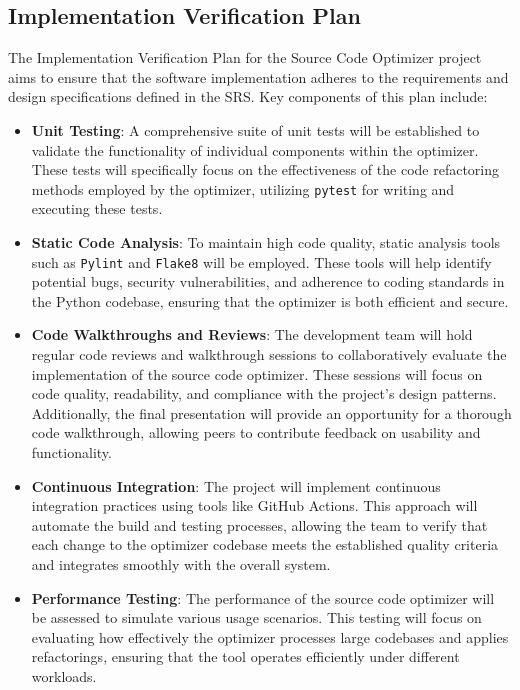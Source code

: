 \documentclass[12pt, titlepage]{article}
\begin{document}
\subsection{Implementation Verification Plan}

The Implementation Verification Plan for the Source Code Optimizer project aims to ensure that the software implementation adheres to the requirements and design specifications defined in the SRS. Key components of this plan include:

\begin{itemize}
    \item \textbf{Unit Testing}: A comprehensive suite of unit tests will be established to validate the functionality of individual components within the optimizer. These tests will specifically focus on the effectiveness of the code refactoring methods employed by the optimizer, utilizing \texttt{pytest} for writing and executing these tests.
    
    \item \textbf{Static Code Analysis}: To maintain high code quality, static analysis tools such as \texttt{Pylint} and \texttt{Flake8} will be employed. These tools will help identify potential bugs, security vulnerabilities, and adherence to coding standards in the Python codebase, ensuring that the optimizer is both efficient and secure.
    
    \item \textbf{Code Walkthroughs and Reviews}: The development team will hold regular code reviews and walkthrough sessions to collaboratively evaluate the implementation of the source code optimizer. These sessions will focus on code quality, readability, and compliance with the project’s design patterns. Additionally, the final presentation will provide an opportunity for a thorough code walkthrough, allowing peers to contribute feedback on usability and functionality.
    
    \item \textbf{Continuous Integration}: The project will implement continuous integration practices using tools like GitHub Actions. This approach will automate the build and testing processes, allowing the team to verify that each change to the optimizer codebase meets the established quality criteria and integrates smoothly with the overall system.
    
    \item \textbf{Performance Testing}: The performance of the source code optimizer will be assessed to simulate various usage scenarios. This testing will focus on evaluating how effectively the optimizer processes large codebases and applies refactorings, ensuring that the tool operates efficiently under different workloads.
\end{itemize}
\end{document}
